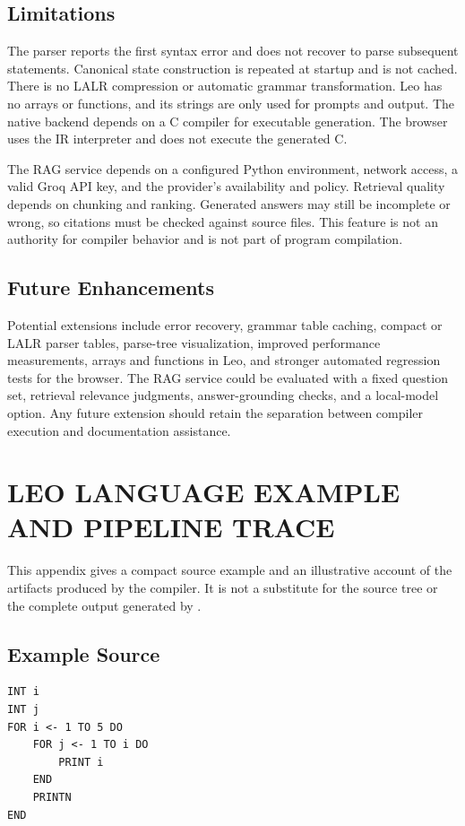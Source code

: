 \documentclass[12pt,a4paper,oneside]{report}
\newcommand{\code}[1]{\texttt{\detokenize{#1}}}
\begin{document}
\section{Limitations}
The parser reports the first syntax error and does not recover to parse subsequent statements. Canonical state construction is repeated at startup and is not cached. There is no LALR compression or automatic grammar transformation. Leo has no arrays or functions, and its strings are only used for prompts and output. The native backend depends on a C compiler for executable generation. The browser uses the IR interpreter and does not execute the generated C.

The RAG service depends on a configured Python environment, network access, a valid Groq API key, and the provider's availability and policy. Retrieval quality depends on chunking and ranking. Generated answers may still be incomplete or wrong, so citations must be checked against source files. This feature is not an authority for compiler behavior and is not part of program compilation.

\section{Future Enhancements}
Potential extensions include error recovery, grammar table caching, compact or LALR parser tables, parse-tree visualization, improved performance measurements, arrays and functions in Leo, and stronger automated regression tests for the browser. The RAG service could be evaluated with a fixed question set, retrieval relevance judgments, answer-grounding checks, and a local-model option. Any future extension should retain the separation between compiler execution and documentation assistance.

\appendix
\chapter{LEO LANGUAGE EXAMPLE AND PIPELINE TRACE}
This appendix gives a compact source example and an illustrative account of the artifacts produced by the compiler. It is not a substitute for the source tree or the complete output generated by \code{leoc}.

\section{Example Source}
\begin{lstlisting}[caption={Nested Loop with a Line-Terminating Print},label={lst:nested-loop}]
INT i
INT j
FOR i <- 1 TO 5 DO
    FOR j <- 1 TO i DO
        PRINT i
    END
    PRINTN
END
\end{lstlisting}
\end{document}

